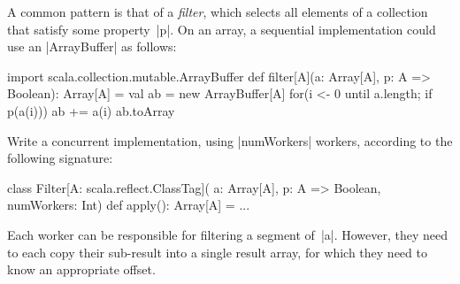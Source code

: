 \begin{questionS}
A common pattern is that of a \emph{filter}, which selects all elements of a
collection that satisfy some property~|p|.  On an array, a sequential
implementation could use an |ArrayBuffer| as follows:
\begin{scala}
  import scala.collection.mutable.ArrayBuffer
  def filter[A](a: Array[A], p: A => Boolean): Array[A] = {
    val ab = new ArrayBuffer[A]
    for(i <- 0 until a.length; if p(a(i))) ab += a(i)
    ab.toArray
  }
\end{scala}

Write a concurrent implementation, using |numWorkers| workers, according to
the following signature:
%
\begin{scala}
class Filter[A: scala.reflect.ClassTag](
    a: Array[A], p: A => Boolean, numWorkers: Int){
  def apply(): Array[A] = ...
}
\end{scala}
%
Each worker can be responsible for filtering a segment of~|a|.  However, they
need to each copy their sub-result into a single result array, for which they
need to know an appropriate offset. 
\end{questionS}


